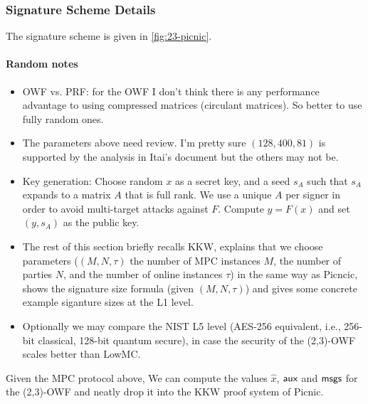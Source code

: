 \subsubsection{Signature Scheme Details}
The signature scheme is given in \cref{fig:23-picnic}.
\paragraph{Random notes} 
\begin{itemize}
\item OWF vs. PRF: for the OWF I don't think there is any performance advantage to
using compressed matrices (circulant matrices). So better to use
fully random ones. 

\item The parameters above need review.  I'm pretty sure $(128, 400, 81)$ is supported
by the analysis in Itai's document but the others may not be. 

\item Key generation: Choose random $x$ as a secret key, and a seed $s_A$ such that
$s_A$ expands to a matrix $A$ that is full rank.  We use a unique $A$ per
signer in order to avoid multi-target attacks against $F$. Compute $y = F(x)$
and set $(y, s_A)$ as the public key.  

\item The rest of this section briefly recalls KKW, explains that we choose
parameters ($(M, N, \tau)$ the number of MPC instances $M$, the number of
parties $N$, and the number of online instances $\tau$) in the same way as
Picncic, shows the signature size formula (given $(M, N, \tau)$) and gives some
concrete example siganture sizes at the L1 level. 

\item Optionally we may compare the NIST L5 level (AES-256 equivalent, i.e., 256-bit
classical, 128-bit quantum secure), in case the security of the (2,3)-OWF
scales better than LowMC. 
\end{itemize}


Given the MPC protocol above, We can compute the values $\hat{x}$, $\textsf{aux}$ and $\textsf{msgs}$ for the (2,3)-OWF 
and neatly drop it into the KKW proof system of Picnic. 


